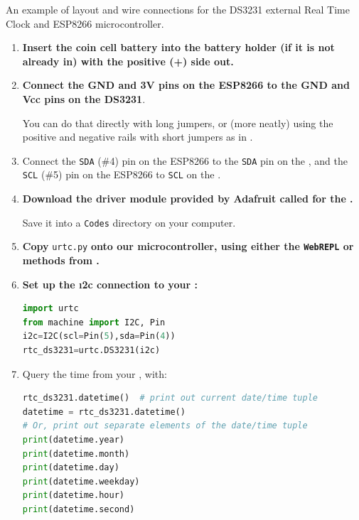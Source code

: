 \begin{marginfigure}
\begin{center}
		\caption[DS3231 on breadboard]{An example of layout and wire connections for the DS3231 external Real Time Clock and ESP8266 microcontroller.}
	\end{center}
\end{marginfigure}
\begin{enumerate}
	\item \textbf{Insert the coin cell battery into the battery holder (if it is not already in) with the positive (+) side out.}
	\item \textbf{Connect the GND and 3V pins on the ESP8266 to the GND and Vcc pins on the DS3231}. 
	
	You can do that directly with long jumpers, or (more neatly) using the positive and negative rails with short jumpers as in .
	\item Connect the \texttt{SDA} (\#4) pin on the ESP8266 to the \texttt{SDA} pin on the , and the  \texttt{SCL} (\#5) pin on the ESP8266 to \texttt{SCL} on the .
	\item \textbf{Download the driver module provided by Adafruit called  for the  \rtc.}
	
	Save it into a \texttt{Codes} directory on your computer.
	
	\item \textbf{Copy } \lstinline{urtc.py} \textbf{onto our microcontroller, using either the \texttt{WebREPL} or \mpfshell methods from .}  
	\item %
	\textbf{Set up the \i2c connection to your :}
\begin{lstlisting}[language=Python]
import urtc
from machine import I2C, Pin
i2c=I2C(scl=Pin(5),sda=Pin(4))
rtc_ds3231=urtc.DS3231(i2c)
\end{lstlisting}
	\item Query the time from your , with:
\begin{lstlisting}[language=Python]
rtc_ds3231.datetime()  # print out current date/time tuple
datetime = rtc_ds3231.datetime()
# Or, print out separate elements of the date/time tuple
print(datetime.year)
print(datetime.month)
print(datetime.day)
print(datetime.weekday)
print(datetime.hour)
print(datetime.second)
\end{lstlisting}
\end{enumerate}

